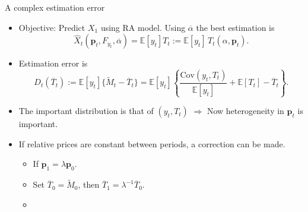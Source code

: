 \documentclass[10pt, handout]{beamer}
\begin{document}
\begin{frame}[label=Category-Error]{A complex estimation error}
	\vfill
	\begin{itemize}
		\item Objective: Predict $X_{1}$ using RA model. Using $\overline{\alpha}$ the best estimation is
				$$\widehat{X}_{t}(\mathbf{p}_{t}, F_{y_{t}}, \overline{\alpha}) = \mathbb{E}[y_{t}]T_{t} := \mathbb{E}[y_{t}]\, T_{t}(\alpha, \mathbf{p}_{t}).$$
			
		\item Estimation error is
				$$D_{t}\left(\overline{T}_{t}\right)
					:=	\mathbb{E}[y_{t}]\Big\{\tilde{M}_{t} - \overline{T}_{t}\Big\}
					=	\mathbb{E}[y_{t}]\left\{ \frac{\mathrm{Cov}\left(y_{t}, T_{t} \right)}{\mathbb{E}[y_{t}]} + \mathbb{E}\left[T_{t}\right] - \overline{T}_{t} \right\}.
				$$
				\vfill
		
		\item The important distribution is that of $(y_{t}, T_{t})$ $\Rightarrow$ Now heterogeneity in $\mathbf{p}_{t}$ is important. \vfill

		\item If relative prices are constant between periods, a correction can be made.\vspace{1ex}
			\begin{itemize}
				\item If $\mathbf{p}_{1} = \lambda \mathbf{p}_{0}$.\vspace{1ex}
				\item Set $\overline{T}_{0} = \tilde{M}_{0}$, then $\overline{T}_{1} = \lambda^{-1}\overline{T}_{0}$.\vspace{1ex}
				\item \hyperlink{Category-OptimalityCondition}{}
			\end{itemize}

	\end{itemize} \vfill

\end{frame}
\end{document}
